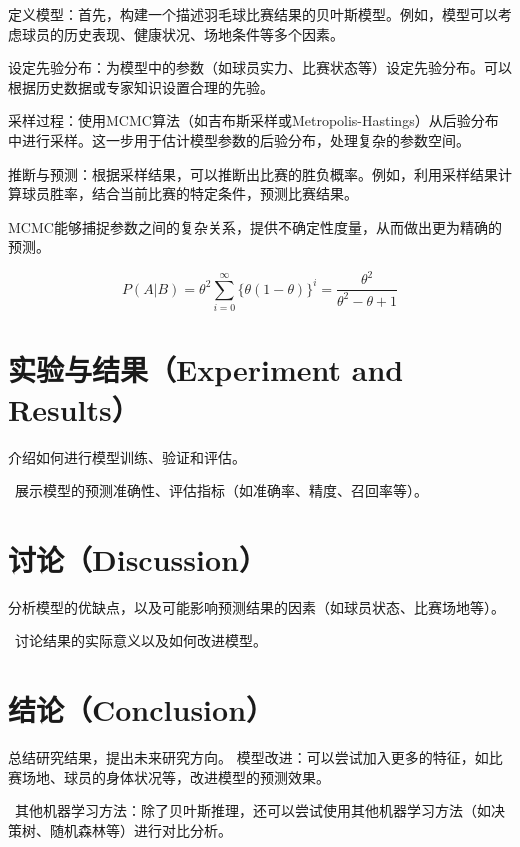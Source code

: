 \documentclass[12pt]{article}
\begin{document}
定义模型：首先，构建一个描述羽毛球比赛结果的贝叶斯模型。例如，模型可以考虑球员的历史表现、健康状况、场地条件等多个因素。

设定先验分布：为模型中的参数（如球员实力、比赛状态等）设定先验分布。可以根据历史数据或专家知识设置合理的先验。

采样过程：使用MCMC算法（如吉布斯采样或Metropolis-Hastings）从后验分布中进行采样。这一步用于估计模型参数的后验分布，处理复杂的参数空间。

推断与预测：根据采样结果，可以推断出比赛的胜负概率。例如，利用采样结果计算球员胜率，结合当前比赛的特定条件，预测比赛结果。

MCMC能够捕捉参数之间的复杂关系，提供不确定性度量，从而做出更为精确的预测。


$$P(A|B)=\theta^2	\sum_{i = 0}^{\infty}	\{\theta (1-\theta ) \}^i = \frac{\theta ^2}{\theta ^2 - \theta +1}    $$


\section{实验与结果（Experiment and Results）}
介绍如何进行模型训练、验证和评估。

\
展示模型的预测准确性、评估指标（如准确率、精度、召回率等）。


\section{讨论（Discussion）}
分析模型的优缺点，以及可能影响预测结果的因素（如球员状态、比赛场地等）。

\
讨论结果的实际意义以及如何改进模型。


\section{结论（Conclusion）}
总结研究结果，提出未来研究方向。
模型改进：可以尝试加入更多的特征，如比赛场地、球员的身体状况等，改进模型的预测效果。

\
其他机器学习方法：除了贝叶斯推理，还可以尝试使用其他机器学习方法（如决策树、随机森林等）进行对比分析。
\end{document}
